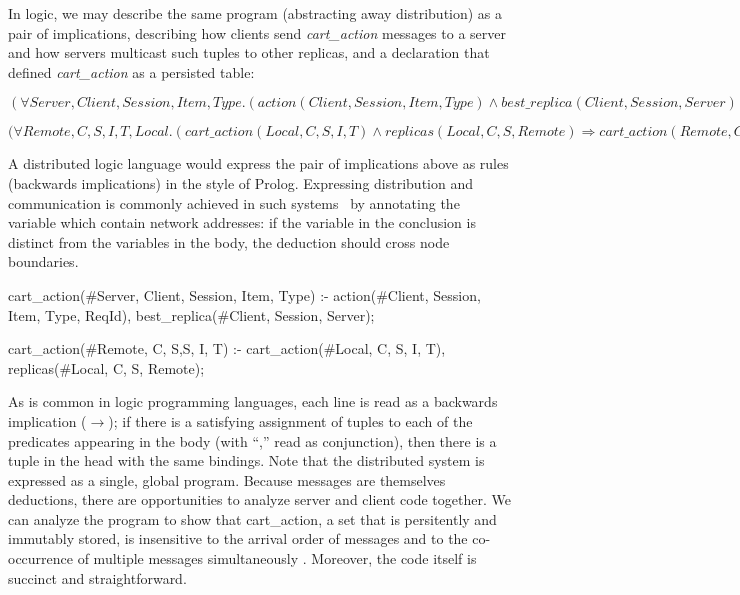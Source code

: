 
In logic, we may describe the same program (abstracting away distribution)
as a pair of implications, describing how clients send {\em cart\_action}
messages to a server and how servers multicast such tuples to other replicas, and 
a declaration that defined {\em cart\_action} as a persisted table:

$(\forall Server, Client, Session, Item, Type . ( action(Client, Session, Item, Type) 
\land best\_replica(Client, Session, Server) ) \Rightarrow cart\_action(Server, Client, Session, Item, Type)) $


$(\forall Remote, C, S, I, T, Local . (cart\_action(Local, C, S, I, T) \land
replicas(Local, C, S, Remote) \Rightarrow cart\_action(Remote, C, S, I, T))
$

A distributed logic language would express the pair of implications above as rules
(backwards implications) in the style of Prolog.  Expressing distribution and communication
is commonly achieved in such systems~\cite{Loo} by annotating the variable which 
contain network addresses: if the variable in the conclusion is distinct from the variables in
the body, the deduction should cross node boundaries.

\begin{Dedalus}
cart\_action(#Server, Client, Session, Item, Type) :-
  action(#Client, Session, Item, Type, ReqId),
  best_replica(#Client, Session, Server);

cart\_action(#Remote, C, S,S, I, T) :-
  cart\_action(#Local, C, S, I, T),
  replicas(#Local, C, S, Remote);
\end{Dedalus}

As is common in logic programming languages, each line is read as a backwards
implication ($\rightarrow$); if there is a satisfying assignment of tuples to each of
the predicates appearing in the body (with ``,'' read as conjunction), 
then there is a tuple in the head with the same bindings.
Note that the distributed system is expressed as a single, global program.
Because messages are themselves deductions, there are opportunities to 
analyze server and client code together.  We can analyze the program to 
show that cart\_action, a set that is persitently and immutably
stored, is insensitive to the arrival order of messages 
and to the co-occurrence of multiple messages simultaneously
. Moreover, the code 
itself is succinct and straightforward. 





